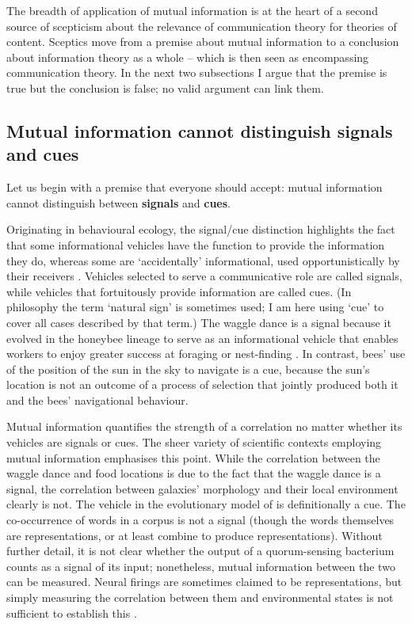 \documentclass[12pt]{article}
\begin{document}


The breadth of application of mutual information is at the heart of a second source of scepticism about the relevance of communication theory for theories of content.
Sceptics move from a premise about mutual information to a conclusion about information theory as a whole -- which is then seen as encompassing communication theory.
In the next two subsections I argue that the premise is true but the conclusion is false; no valid argument can link them.

\subsection{Mutual information cannot distinguish signals and cues}

Let us begin with a premise that everyone should accept: mutual information cannot distinguish between \textbf{signals} and \textbf{cues}.

Originating in behavioural ecology, the signal/cue distinction highlights the fact that some informational vehicles have the function to provide the information they do, whereas some are `accidentally' informational, used opportunistically by their receivers \citep[$\S$1.2]{maynardsmith2003animal}.
Vehicles selected to serve a communicative role are called signals, while vehicles that fortuitously provide information are called cues.
(In philosophy the term `natural sign' is sometimes used; I am here using `cue' to cover all cases described by that term.)
The waggle dance is a signal because it evolved in the honeybee lineage to serve as an informational vehicle that enables workers to enjoy greater success at foraging or nest-finding \citep{gould1975honey,riley2005flight}.
In contrast, bees' use of the position of the sun in the sky to navigate is a cue, because the sun's location is not an outcome of a process of selection that jointly produced both it and the bees' navigational behaviour.

Mutual information quantifies the strength of a correlation no matter whether its vehicles are signals or cues.
The sheer variety of scientific contexts employing mutual information emphasises this point.
While the correlation between the waggle dance and food locations is due to the fact that the waggle dance is a signal, the correlation between galaxies' morphology and their local environment clearly is not.
The vehicle in the evolutionary model of \citet{donaldson-matasci2010fitness} is definitionally a cue.
The co-occurrence of words in a corpus is not a signal (though the words themselves are representations, or at least combine to produce representations).
Without further detail, it is not clear whether the output of a quorum-sensing bacterium counts as a signal of its input; nonetheless, mutual information between the two can be measured.
Neural firings are sometimes claimed to be representations, but simply measuring the correlation between them and environmental states is not sufficient to establish this \citep{rathkopf2017neural}.
\end{document}
